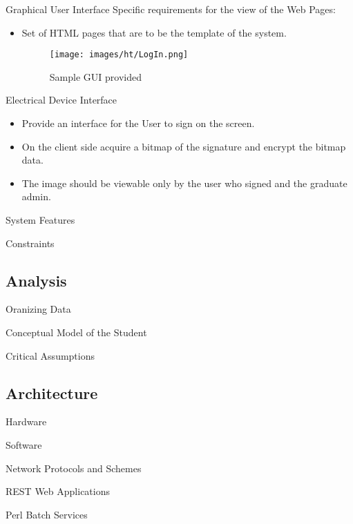 \documentclass{beamer}
\begin{document}
\begin{frame}{Graphical User Interface}
Specific requirements for the view of the Web Pages:
\begin{itemize}
\item 
Set of HTML pages that are to be the template of the system.
\begin{figure}
\texttt{[image: images/ht/LogIn.png]} \caption{ Sample GUI provided }
\end{figure}
\end{itemize}
\end{frame}


\begin{frame}{Electrical Device Interface}
\begin{itemize}
\item
Provide an interface for the User to sign on the screen.
\item
On the client side acquire a bitmap of the signature and encrypt the bitmap data.
\item 
The image should be viewable only by the user who signed and the graduate admin.
\end{itemize}
\end{frame}

\begin{frame}{System Features}
\end{frame}

\begin{frame}{Constraints}
\end{frame}

\subsection{Analysis}
\begin{frame}{Oranizing Data}
\end{frame}
\begin{frame}{Conceptual Model of the Student}
\end{frame}
\begin{frame}{Critical Assumptions}
\end{frame}

\subsection{Architecture}
\begin{frame}{Hardware}
\end{frame}
\begin{frame}{Software}
\end{frame}
\begin{frame}{Network Protocols and Schemes}
\end{frame}
\begin{frame}{ REST Web Applications}
\end{frame}
\begin{frame}{Perl Batch Services}
\end{frame}
\end{document}
